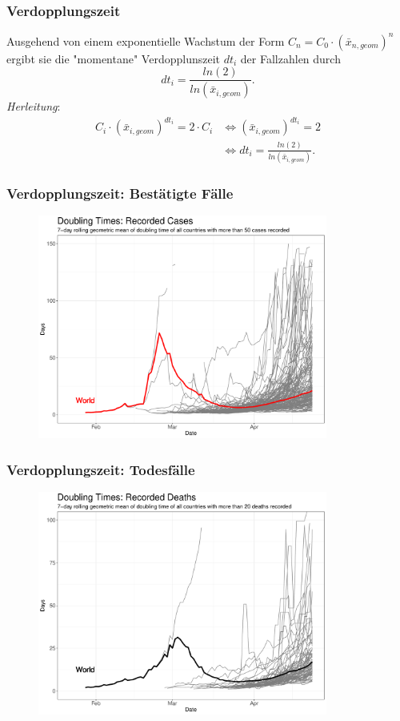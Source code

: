 \documentclass{beamer}
\begin{document}
\begin{frame}
\frametitle{Verdopplungszeit}
	Ausgehend von einem exponentielle Wachstum der Form $C_n = C_0 \cdot (\bar{x}_{n, geom})^{n}$ ergibt sie die "momentane" Verdopplunszeit $dt_i$ der Fallzahlen durch $$dt_i = \frac{ln(2)}{ln(\bar{x}_{i, geom})}.$$
	\pause
	\emph{Herleitung}: 
	\begin{align*} C_i \cdot (\bar{x}_{i, geom})^{dt_i} = 2 \cdot C_i 
	 &\iff (\bar{x}_{i, geom})^{dt_i} = 2 \\
	 &\iff dt_i = \frac{ln(2)}{ln(\bar{x}_{i, geom})}.
	\end{align*}
\end{frame}

\begin{frame}
\frametitle{Verdopplungszeit: Bestätigte Fälle}
	\begin{figure}
		\centering
		\includegraphics[width = 270pt]{DT_confirmed}
	\end{figure}
\end{frame}

\begin{frame}
\frametitle{Verdopplungszeit: Todesfälle}
	\begin{figure}
		\centering
		\includegraphics[width = 270pt]{DT_deaths}
	\end{figure}
\end{frame}
\end{document}
